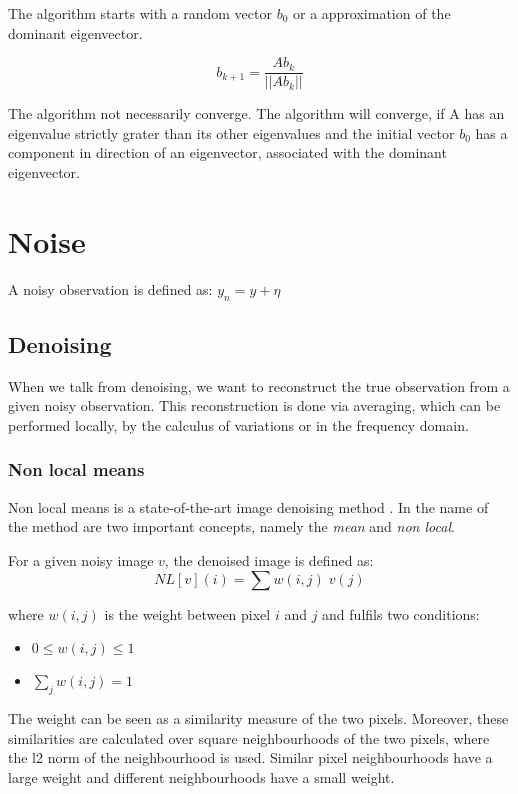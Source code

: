 The algorithm starts with a random vector $b_0$ or a approximation of the dominant eigenvector.

\begin{equation}
    b_{k+1} = \frac{Ab_k}{||Ab_k||}
\end{equation}

The algorithm not necessarily converge. The algorithm will converge, if A has an eigenvalue strictly grater than its other eigenvalues
and the initial vector $b_0$ has a component in direction of an eigenvector, associated with the dominant eigenvector.


\section{Noise}
A noisy observation is defined as:
$y_n = y + \eta$

\subsection{Denoising}
When we talk from denoising, we want to reconstruct the true observation 
from a given noisy observation. This reconstruction is done via averaging, which can be performed
locally, by the calculus of variations or in the frequency domain.

\subsubsection{Non local means}
Non local means is a state-of-the-art image denoising method \cite{noneLocalMean}.
In the name of the method are two important concepts, namely the \textit{mean}
and \textit{non local}.

For a given noisy image $v$, the denoised image is defined as:
\begin{equation}
    NL[v](i) = \sum{w(i,j) \; v(j)}
\end{equation}

where $w(i,j)$ is the weight between pixel $i$ and $j$ and fulfils two conditions:
\begin{itemize}
    \item $0 \le w(i,j) \le 1$
    \item $\sum_j{w(i,j) = 1}$
\end{itemize}

The weight can be seen as a similarity measure of the two pixels.
Moreover, these similarities are calculated over square neighbourhoods of the two pixels,
where the l2 norm of the neighbourhood is used.
Similar pixel neighbourhoods have a large weight and different neighbourhoods have a small weight.

